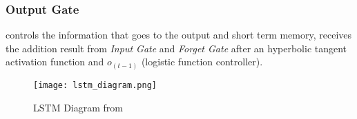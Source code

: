 \subsubsection{Output Gate} controls the information that goes to the output and short term memory,
receives the addition result from \textit{Input Gate} and \textit{Forget Gate} after an hyperbolic tangent activation function and $o_{(t-1)}$ (logistic function controller).

\begin{figure}
	\centering
	\texttt{[image: lstm\_diagram.png]}
	\caption{LSTM Diagram from \cite{geron2017hands}\label{fig:lstm_diagram}}
\end{figure}



